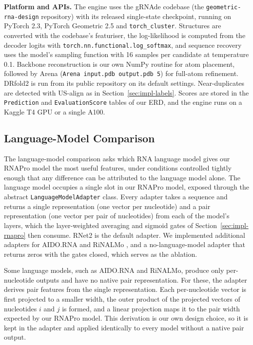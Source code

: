 \documentclass{FastFyp}
\begin{document}
\textbf{Platform and APIs.} The engine uses the gRNAde codebase (the \texttt{geometric-rna-design} repository) with its released single-state checkpoint, running on PyTorch 2.3, PyTorch Geometric 2.5 and \texttt{torch\_cluster}. Structures are converted with the codebase's featuriser, the log-likelihood is computed from the decoder logits with \texttt{torch.nn.functional.log\_softmax}, and sequence recovery uses the model's sampling function with 16 samples per candidate at temperature 0.1. Backbone reconstruction is our own NumPy routine for atom placement, followed by Arena (\texttt{Arena input.pdb output.pdb 5}) for full-atom refinement. DRfold2 is run from its public repository on its default settings. Near-duplicates are detected with US-align as in Section~\ref{sec:impl-labels}. Scores are stored in the \texttt{Prediction} and \texttt{EvaluationScore} tables of our ERD, and the engine runs on a Kaggle T4 GPU or a single A100.

\subsection{Language-Model Comparison}
\label{sec:impl-lm}
The language-model comparison asks which RNA language model gives our RNAPro model the most useful features, under conditions controlled tightly enough that any difference can be attributed to the language model alone. The language model occupies a single slot in our RNAPro model, exposed through the abstract \texttt{LanguageModelAdapter} class. Every adapter takes a sequence and returns a single representation (one vector per nucleotide) and a pair representation (one vector per pair of nucleotides) from each of the model's layers, which the layer-weighted averaging and sigmoid gates of Section~\ref{sec:impl-rnapro} then consume. RNet2 is the default adapter. We implemented additional adapters for AIDO.RNA \cite{zou2024} and RiNALMo \cite{ref:Penic:2024}, and a no-language-model adapter that returns zeros with the gates closed, which serves as the ablation.

Some language models, such as AIDO.RNA and RiNALMo, produce only per-nucleotide outputs and have no native pair representation. For these, the adapter derives pair features from the single representation. Each per-nucleotide vector is first projected to a smaller width, the outer product of the projected vectors of nucleotides $i$ and $j$ is formed, and a linear projection maps it to the pair width expected by our RNAPro model. This derivation is our own design choice, so it is kept in the adapter and applied identically to every model without a native pair output.
\end{document}
